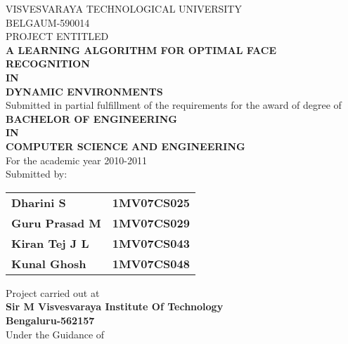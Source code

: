 \newcommand{\tab}{\hspace*{8.5 cm}}

%
\begin{center}
VISVESVARAYA TECHNOLOGICAL UNIVERSITY \\ BELGAUM-590014 \\
\vspace{5mm}
PROJECT ENTITLED\\
\vspace{5mm}
\textbf{A LEARNING ALGORITHM FOR OPTIMAL FACE RECOGNITION \\ IN \\ DYNAMIC ENVIRONMENTS}\\
\vspace{5mm}
Submitted in partial fulfillment of the requirements for the award of degree of \\
\vspace{5mm}
\textbf{BACHELOR OF ENGINEERING}\\
\textbf{IN}\\
\textbf{COMPUTER SCIENCE AND ENGINEERING}\\
\vspace{5mm}
For the academic year 2010-2011\\
\vspace{5mm}
Submitted by:
\vspace{5mm}
\\
\begin{table}[h]
\begin{tabular}{lr}
\textbf{Dharini S} \tab & \textbf{1MV07CS025}   \\
\textbf{Guru Prasad M} \tab & \textbf{1MV07CS029}   \\
\textbf{Kiran Tej J L}  \tab & \textbf{1MV07CS043}  \\
\textbf{Kunal Ghosh} \tab &  \textbf{1MV07CS048}   \\ 
\end{tabular}
\end{table}
\vspace{5mm}
Project carried out at \\
\vspace{5mm}
\textbf{Sir M Visvesvaraya Institute Of Technology}\\
\vspace{5mm}
\textbf{Bengaluru-562157}\\
\vspace{5mm}
Under the Guidance of\\
\vspace{5mm}

\end{center}
